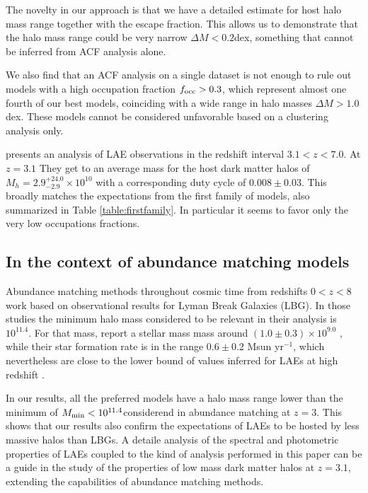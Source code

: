 \documentclass[usenatbib]{mn2e}
\newcommand{\hMsun}{{\ifmmode{h^{-1}{\rm
        {M_{\odot}}}}\else{$h^{-1}{\rm{M_{\odot}}}$}\fi}}
\begin{document}
The novelty in our approach is that we have a detailed estimate for 
host halo mass range together with the escape fraction. This allows us
to demonstrate that the halo mass range could be very narrow $\Delta M <
0.2$dex, something that cannot be inferred from ACF analysis alone. 

We also find that an ACF analysis on a single dataset is not enough to rule
out models with a high occupation fraction $f_{\rm occ}>0.3$, which
represent almost one fourth of our best models, coinciding with a wide
range in halo masses $\Delta M>1.0$ dex. These models cannot be
considered unfavorable based on a clustering analysis only.

\cite{Ouchi2010} presents an analysis of LAE observations in the
redshift interval $3.1<z<7.0$. At $z=3.1$ They get to an average
mass for the host dark matter halos of $M_{h}=2.9^{+24.0}_{-2.9}\times
10^{10}$ \hMsun with a corresponding duty cycle of $0.008\pm
0.03$. This broadly matches the expectations from the first family of
models, also summarized in Table \ref{table:firstfamily}. In
particular it seems to favor only the very low occupations fractions.   


\subsection{In the context of abundance matching models}


Abundance matching methods throughout cosmic time from redshifts
$0<z<8$ \cite{Behroozi2013a,Behroozi2013b} work based on observational
results for Lyman Break Galaxies (LBG). In those studies the minimum halo
mass considered to be relevant in their analysis is
$10^{11.4}$\hMsun. For that mass, \cite{Behroozi2013a} report a
stellar mass mass around $(1.0\pm0.3)\times 10^{9.0}$
\hMsun, while their star formation rate is in the range $0.6\pm 0.2$
Msun yr$^{-1}$, which nevertheless are close to the lower bound of
values inferred for LAEs at high redshift
\citep{Gawiser2007,Nilsson2009,Pentericci2009}.   


In our results, all the preferred models have a halo mass range lower
than the minimum of $M_{\rm min}<10^{11.4}$\hMsun considerend in
abundance matching at $z=3$. This shows that our results also confirm
the expectations of LAEs to be hosted by less massive halos than LBGs.
A detaile analysis of the spectral and photometric properties of LAEs
coupled to the kind of analysis performed in this paper can be a guide
in the study of the properties of low mass dark matter halos at
$z=3.1$, extending the capabilities of abundance matching methods.
\end{document}
